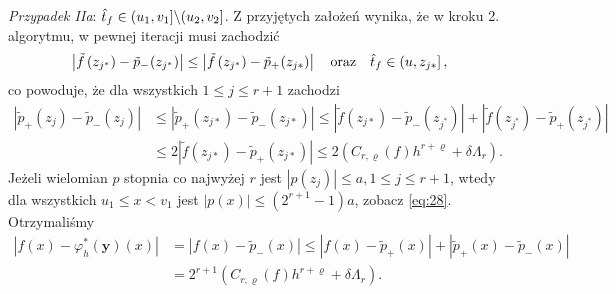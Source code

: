 \documentclass[oik, pdftex, robocza, man]{mgrwms}
\begin{document}
    \textit{Przypadek IIa}: $\hat{t}_{f} \in (u_{1}, v_{1}] \backslash (u_{2}, v_{2}]$.
    Z przyjętych założeń wynika, że w kroku 2. algorytmu, w pewnej iteracji musi zachodzić
    \begin{equation*}
        \left|\tilde{f}\left(z_{j^{*}}\right)-\tilde{p}_{-\!}\left(z_{j^{*}}\right)\right| \leq\left|\tilde{f}\left(z_{j^{*}}\right)-\tilde{p}_{+\!}\left(z_{j *}\right)\right| \quad \text{oraz} \quad \hat{t}_{f} \in\left(u, z_{j *}\right],
    \end{equation*}
    co powoduje, że dla wszystkich $1 \leq j \leq r+1$ zachodzi
    \begin{equation*}
        \begin{aligned}
            \left|\tilde{p}_{+}\left(z_{j}\right)-\tilde{p}_{-}\left(z_{j}\right)\right| & 
            \leq\left|\tilde{p}_{+}\left(z_{j *}\right)-\tilde{p}_{-}\left(z_{j *}\right)\right| \leq\left|\tilde{f}\left(z_{j *}\right)-\tilde{p}_{-}\left(z_{j^{*}}\right)\right|+\left|\tilde{f}\left(z_{j^{*}}\right)-\tilde{p}_{+}\left(z_{j^{*}}\right)\right| \\
            & \leq 2\left|\tilde{f}\left(z_{j *}\right)-\tilde{p}_{+}\left(z_{j *}\right)\right| \leq 2\left(C_{r, \varrho}(f) h^{r+\varrho}+\delta \Lambda_{r}\right).
        \end{aligned}
    \end{equation*}
    Jeżeli wielomian $p$ stopnia co najwyżej $r$ jest $\left|p\left(z_{j}\right)\right| \leq a, 1 \leq j \leq r+1$, wtedy dla wszystkich $u_{1} \leq x<v_{1}$ jest $|p(x)| \leq\left(2^{r+1}-1\right) a$, zobacz \eqref{eq:28}. Otrzymaliśmy
    \begin{equation*}
        \begin{aligned}
            \left|f(x)-\varphi_{h}^{*}(\mathbf{y})(x)\right| &=\left|f(x)-\tilde{p}_{-}(x)\right| \leq\left|f(x)-\tilde{p}_{+}(x)\right|+\left|\tilde{p}_{+}(x)-\tilde{p}_{-}(x)\right| \\
            &=2^{r+1}\left(C_{r, \varrho}(f) h^{r+\varrho}+\delta \Lambda_{r}\right).
        \end{aligned}
    \end{equation*}
\end{document}
